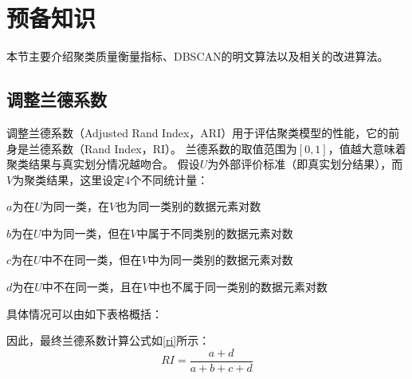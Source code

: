 \section{预备知识}
本节主要介绍聚类质量衡量指标、DBSCAN的明文算法以及相关的改进算法。
\label{s4-yubei}

\subsection{调整兰德系数}
\label{s4-ari-intro}
调整兰德系数（Adjusted Rand Index，ARI）\cite{hubert1985comparing}用于评估聚类模型的性能，它的前身是兰德系数（Rand Index，RI）。
兰德系数的取值范围为$ [0,1] $，值越大意味着聚类结果与真实划分情况越吻合。
假设$ U $为外部评价标准（即真实划分结果），而$ V $为聚类结果，这里设定4个不同统计量：
\begin{compactitem}
	\item $ a $为在$ U $为同一类，在$ V $也为同一类别的数据元素对数
	\item $ b $为在$ U $中为同一类，但在$ V $中属于不同类别的数据元素对数
	\item $ c $为在$ U $中不在同一类，但在$ V $中为同一类别的数据元素对数
	\item $ d $为在$ U $中不在同一类，且在$ V $中也不属于同一类别的数据元素对数
\end{compactitem}

具体情况可以由如下表格概括：

\begin{table}[htbp]
	\centering
	\renewcommand{\arraystretch}{1.3}
	\caption{数据集具体信息}
	\label{s4-table-dataset}
\end{table}

因此，最终兰德系数计算公式如\ref{ri}所示：
\begin{equation}
	R I=\frac{a+d}{a+b+c+d}
	\label{ri}
\end{equation}


